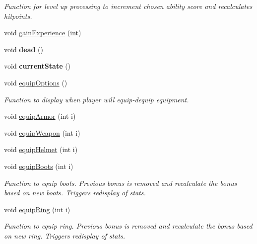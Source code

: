 \begin{DoxyCompactItemize}
\begin{DoxyCompactList}\small\item\em Function for level up processing to increment chosen ability score and recalculates hitpoints. \end{DoxyCompactList}\item 
void \hyperlink{class_fighter_af411947929c37ef0a0eab87b0c45f4f3}{gain\+Experience} (int)
\item 
\hypertarget{class_fighter_af690e4afec50a9c446120db47b463d84}{}\label{class_fighter_af690e4afec50a9c446120db47b463d84} 
void {\bfseries dead} ()
\item 
\hypertarget{class_fighter_ae888de59ae299553890387c58d774bda}{}\label{class_fighter_ae888de59ae299553890387c58d774bda} 
void {\bfseries current\+State} ()
\item 
\hypertarget{class_fighter_a60976eb2c11504befe0aff8522339636}{}\label{class_fighter_a60976eb2c11504befe0aff8522339636} 
void \hyperlink{class_fighter_a60976eb2c11504befe0aff8522339636}{equip\+Options} ()
\begin{DoxyCompactList}\small\item\em Function to display when player will equip-\/dequip equipment. \end{DoxyCompactList}\item 
void \hyperlink{class_fighter_acabd4955401ddf3ddc0be5f28fa64267}{equip\+Armor} (int i)
\item 
void \hyperlink{class_fighter_a4d88916d33514e2c7e5aaaef8916f93c}{equip\+Weapon} (int i)
\item 
void \hyperlink{class_fighter_ae90d7de8a4d6b61b35f43cefe7ec940c}{equip\+Helmet} (int i)
\item 
\hypertarget{class_fighter_aabfc72ac049b808fabbb77aa9fdfcba4}{}\label{class_fighter_aabfc72ac049b808fabbb77aa9fdfcba4} 
void \hyperlink{class_fighter_aabfc72ac049b808fabbb77aa9fdfcba4}{equip\+Boots} (int i)
\begin{DoxyCompactList}\small\item\em Function to equip boots. Previous bonus is removed and recalculate the bonus based on new boots. Triggers redisplay of stats. \end{DoxyCompactList}\item 
\hypertarget{class_fighter_a51cff2d6b9af41b0f6a2ca3a26b6eb42}{}\label{class_fighter_a51cff2d6b9af41b0f6a2ca3a26b6eb42} 
void \hyperlink{class_fighter_a51cff2d6b9af41b0f6a2ca3a26b6eb42}{equip\+Ring} (int i)
\begin{DoxyCompactList}\small\item\em Function to equip ring. Previous bonus is removed and recalculate the bonus based on new ring. Triggers redisplay of stats. \end{DoxyCompactList}\item 

\end{DoxyCompactItemize}
